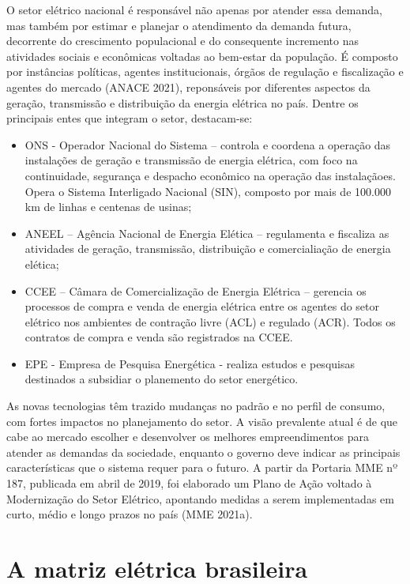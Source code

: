 \documentclass[
  oneside]{scrbook}
\providecommand{\tightlist}{%
  \setlength{\itemsep}{0pt}\setlength{\parskip}{0pt}}
\begin{document}
O setor elétrico nacional é responsável não apenas por atender essa demanda, mas também por estimar e planejar o atendimento da demanda futura, decorrente do crescimento populacional e do consequente incremento nas atividades sociais e econômicas voltadas ao bem-estar da população. É composto por instâncias políticas, agentes institucionais, órgãos de regulação e fiscalização e agentes do mercado (ANACE 2021), reponsáveis por diferentes aspectos da geração, transmissão e distribuição da energia elétrica no país. Dentre os principais entes que integram o setor, destacam-se:

\begin{itemize}
\tightlist
\item
  ONS - Operador Nacional do Sistema -- controla e coordena a operação das instalações de geração e transmissão de energia elétrica, com foco na continuidade, segurança e despacho econômico na operação das instalaçãoes. Opera o Sistema Interligado Nacional (SIN), composto por mais de 100.000 km de linhas e centenas de usinas;
\item
  ANEEL -- Agência Nacional de Energia Elética -- regulamenta e fiscaliza as atividades de geração, transmissão, distribuição e comercialiação de energia elética;
\item
  CCEE -- Câmara de Comercialização de Energia Elétrica -- gerencia os processos de compra e venda de energia elétrica entre os agentes do setor elétrico nos ambientes de contração livre (ACL) e regulado (ACR). Todos os contratos de compra e venda são registrados na CCEE.
\item
  EPE - Empresa de Pesquisa Energética - realiza estudos e pesquisas destinados a subsidiar o planemento do setor energético.
\end{itemize}

As novas tecnologias têm trazido mudanças no padrão e no perfil de consumo, com fortes impactos no planejamento do setor. A visão prevalente atual é de que cabe ao mercado escolher e desenvolver os melhores empreendimentos para atender as demandas da sociedade, enquanto o governo deve indicar as principais características que o sistema requer para o futuro. A partir da Portaria MME nº 187, publicada em abril de 2019, foi elaborado um Plano de Ação voltado à Modernização do Setor Elétrico, apontando medidas a serem implementadas em curto, médio e longo prazos no país (MME 2021a).

\hypertarget{a-matriz-eluxe9trica-brasileira}{%
\section{A matriz elétrica brasileira}\label{a-matriz-eluxe9trica-brasileira}}
\end{document}
